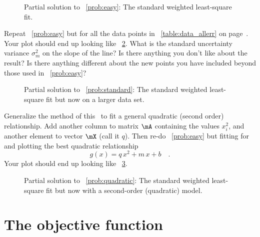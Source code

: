 \documentclass[12pt,twoside,pdftex]{article}
\newcommand{\numberparagraphs}{}
\begin{document}
\begin{figure}[!htbp]
\caption{Partial solution to \problemname~\ref{prob:easy}: The
standard weighted least-square fit.}\label{fig:easy}
\end{figure}

\begin{problem}\label{prob:standard}
Repeat \problemname~\ref{prob:easy} but for all the data points in
\tablename~\ref{table:data_allerr} on
page~\pageref{table:data_allerr}.  Your plot should end up looking
like \figurename~\ref{fig:standard}.  What is the standard uncertainty
variance $\sigma_m^2$ on the slope of the line?  Is there anything you
don't like about the result?  Is there anything different about the
new points you have included beyond those used in
\problemname~\ref{prob:easy}?
\end{problem}

\begin{figure}[htbp!]
\caption{Partial solution to \problemname~\ref{prob:standard}: The
standard weighted least-square fit but now on a larger data
set.}\label{fig:standard}
\end{figure}

\begin{problem}\label{prob:quadratic}
Generalize the method of this \sectionname\ to fit a general quadratic
(second order) relationship.  Add another column to matrix $\mA$
containing the values $x_i^2$, and another element to vector $\mX$
(call it $q$).  Then re-do \problemname~\ref{prob:easy} but
fitting for and plotting the best quadratic relationship
\begin{equation}
g(x) = q\,x^2 + m\,x + b \quad.
\end{equation}
Your plot should end up looking like \figurename~\ref{fig:quadratic}.
\end{problem}

\begin{figure}[htbp!]
\caption{Partial solution to \problemname~\ref{prob:quadratic}: The
standard weighted least-square fit but now with a second-order
(quadratic) model.}\label{fig:quadratic}
\end{figure}
\numberparagraphs

\section{The objective function}\label{sec:objective}
\end{document}
